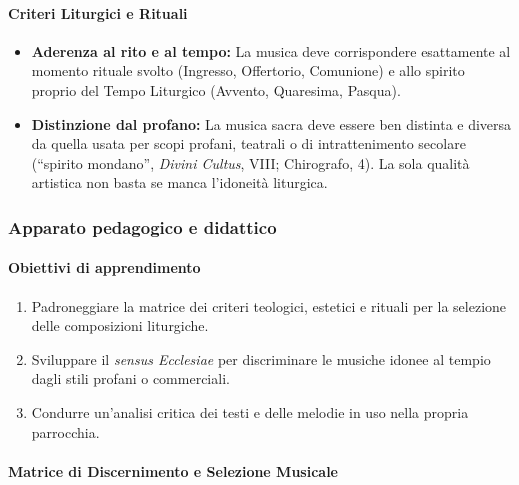 \documentclass[12pt,a4paper]{article}
\begin{document}
	\paragraph{Criteri Liturgici e Rituali}\label{criteri-liturgici-e-rituali}
	
	\begin{itemize}[leftmargin=*]
		\item \textbf{Aderenza al rito e al tempo:} La musica deve corrispondere esattamente al momento rituale svolto (Ingresso, Offertorio, Comunione) e allo spirito proprio del Tempo Liturgico (Avvento, Quaresima, Pasqua).
		\item \textbf{Distinzione dal profano:} La musica sacra deve essere ben distinta e diversa da quella usata per scopi profani, teatrali o di intrattenimento secolare (``spirito mondano'', \emph{Divini Cultus}, VIII; Chirografo, 4). La sola qualità artistica non basta se manca l'idoneità liturgica.
	\end{itemize}
	
	\subsubsection{Apparato pedagogico e didattico}\label{apparato-pedagogico-e-didattico-5}
	
	\paragraph{Obiettivi di apprendimento}\label{obiettivi-di-apprendimento-5}
	
	\begin{enumerate}[label=\arabic*.,leftmargin=*]
		\item Padroneggiare la matrice dei criteri teologici, estetici e rituali per la selezione delle composizioni liturgiche.
		\item Sviluppare il \emph{sensus Ecclesiae} per discriminare le musiche idonee al tempio dagli stili profani o commerciali.
		\item Condurre un'analisi critica dei testi e delle melodie in uso nella propria parrocchia.
	\end{enumerate}
	
	\paragraph{Matrice di Discernimento e Selezione Musicale}\label{matrice-di-discernimento-e-selezione-musicale}
	
\end{document}
